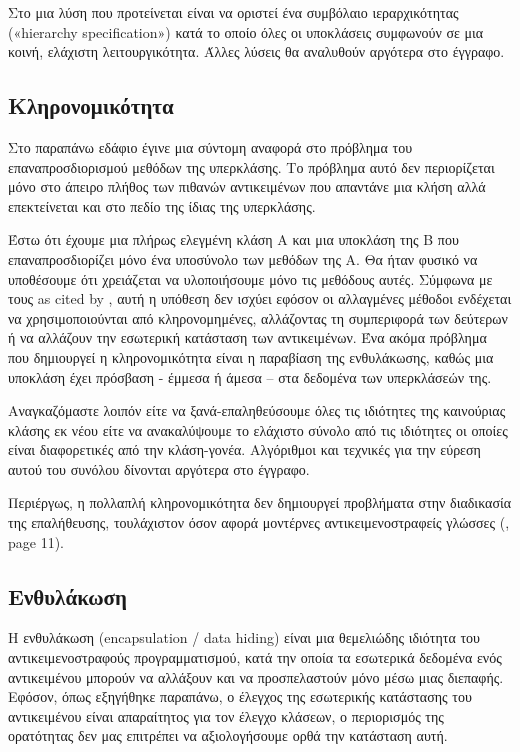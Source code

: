 \documentclass[12pt]{article}
\begin{document}
\par Στο \textcite{chandra} μια λύση που προτείνεται είναι να οριστεί ένα συμβόλαιο ιεραρχικότητας («hierarchy specification») κατά το οποίο όλες οι υποκλάσεις συμφωνούν σε μια κοινή, ελάχιστη λειτουργικότητα. Άλλες λύσεις θα αναλυθούν αργότερα στο έγγραφο.

\subsection{Κληρονομικότητα}

Στο παραπάνω εδάφιο έγινε μια σύντομη αναφορά στο πρόβλημα του επαναπροσδιορισμού μεθόδων της υπερκλάσης. Το πρόβλημα αυτό δεν περιορίζεται μόνο στο άπειρο πλήθος των πιθανών αντικειμένων που απαντάνε μια κλήση αλλά επεκτείνεται και στο πεδίο της ίδιας της υπερκλάσης.

\par Έστω ότι έχουμε μια πλήρως ελεγμένη κλάση Α και μια υποκλάση της Β που επαναπροσδιορίζει μόνο ένα υποσύνολο των μεθόδων της Α. Θα ήταν φυσικό να υποθέσουμε ότι χρειάζεται να υλοποιήσουμε μόνο τις μεθόδους αυτές. Σύμφωνα με τους \textcite{perry} as cited by \textcite{barbey}, αυτή η υπόθεση δεν ισχύει εφόσον οι αλλαγμένες μέθοδοι ενδέχεται να χρησιμοποιούνται από κληρονομημένες, αλλάζοντας τη συμπεριφορά των δεύτερων ή να αλλάζουν την εσωτερική κατάσταση των αντικειμένων. Ένα ακόμα πρόβλημα που δημιουργεί η κληρονομικότητα είναι η παραβίαση της ενθυλάκωσης, καθώς μια υποκλάση έχει πρόσβαση - έμμεσα ή άμεσα – στα δεδομένα των υπερκλάσεών της. 

\par Αναγκαζόμαστε λοιπόν είτε να ξανά-επαληθεύσουμε όλες τις ιδιότητες της καινούριας κλάσης εκ νέου είτε να ανακαλύψουμε το ελάχιστο σύνολο από τις ιδιότητες οι οποίες είναι διαφορετικές από την κλάση-γονέα. Αλγόριθμοι και τεχνικές για την εύρεση αυτού του συνόλου δίνονται αργότερα στο έγγραφο.

\par Περιέργως, η πολλαπλή κληρονομικότητα δεν δημιουργεί προβλήματα στην διαδικασία της επαλήθευσης, τουλάχιστον όσον αφορά μοντέρνες αντικειμενοστραφείς γλώσσες (\textcite{barbey}, page 11).

\subsection{Ενθυλάκωση}

Η ενθυλάκωση (encapsulation / data hiding) είναι μια θεμελιώδης ιδιότητα του αντικειμενοστραφούς προγραμματισμού, κατά την οποία τα εσωτερικά δεδομένα ενός αντικειμένου μπορούν να αλλάξουν και να προσπελαστούν μόνο μέσω μιας διεπαφής. Εφόσον, όπως εξηγήθηκε παραπάνω, ο έλεγχος της εσωτερικής κατάστασης του αντικειμένου είναι απαραίτητος για τον έλεγχο κλάσεων, ο περιορισμός της ορατότητας δεν μας επιτρέπει να αξιολογήσουμε ορθά την κατάσταση αυτή. 
\end{document}
